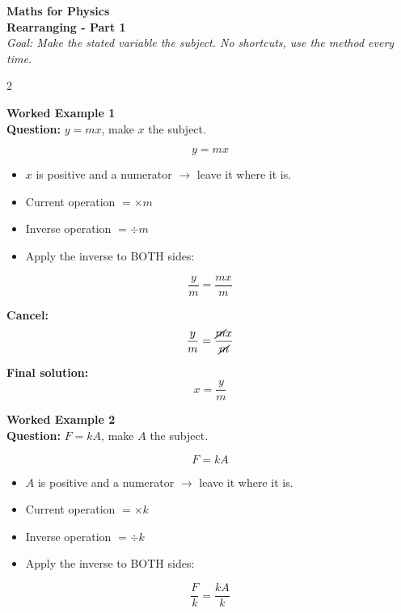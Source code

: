 \documentclass[11pt]{article}
\begin{document}
\begin{center}
    {\LARGE \textbf{Maths for Physics}}\\
    {\large \textbf{Rearranging - Part 1}}\\[4pt]
    \textit{Goal: Make the stated variable the subject. No shortcuts, use the method every time.}
\end{center}

\vspace{10pt}

\begin{multicols}{2}
\raggedcolumns

\textbf{Worked Example 1}\\
\textbf{Question:} \( y = mx \), make \( x \) the subject.

\[
y = mx
\]

\begin{itemize}[leftmargin=*, itemsep=2pt]
    \item \(x\) is positive and a numerator $\rightarrow$ leave it where it is.
    \item Current operation \(= \times m\)
    \item Inverse operation \(= \div m\)
    \item Apply the inverse to BOTH sides:
\end{itemize}

\[
\frac{y}{m}=\frac{mx}{m}
\]

\textbf{Cancel:}
\[
\frac{y}{m}=\frac{\cancel{m}x}{\cancel{m}}
\]

\textbf{Final solution:}
\[
x=\frac{y}{m}
\]


\textbf{Worked Example 2}\\
\textbf{Question:} \( F = kA \), make \( A \) the subject.

\[
F = kA
\]

\begin{itemize}[leftmargin=*, itemsep=2pt]
    \item \(A\) is positive and a numerator $\rightarrow$ leave it where it is.
    \item Current operation \(= \times k\)
    \item Inverse operation \(= \div k\)
    \item Apply the inverse to BOTH sides:
\end{itemize}

\[
\frac{F}{k}=\frac{kA}{k}
\]


\end{multicols}
\end{document}
